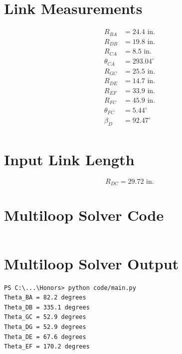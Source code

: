\documentclass[hidelinks]{article}
\begin{document}
    \FloatBarrier\section*{Link Measurements}
    \begin{align*}
        R_{BA}&=24.4 \text{ in.} \\
        R_{DB}&=19.8 \text{ in.} \\
        R_{CA}&=8.5 \text{ in.} \\
        \theta_{CA}&=293.04^\circ \\
        R_{GC}&=25.5 \text{ in.} \\
        R_{DE}&=14.7 \text{ in.} \\
        R_{EF}&=33.9 \text{ in.} \\
        R_{FC}&=45.9 \text{ in.} \\
        \theta_{FC}&=5.44^\circ \\
        \beta_{D}&=92.47^\circ \\
    \end{align*}

    \FloatBarrier\section*{Input Link Length}
    \begin{equation*}
        R_{DC}=29.72 \text{ in.}
    \end{equation*}
        
    \FloatBarrier\section*{Multiloop Solver Code}
    
    \inputminted[python3=true]{python}{../code/main.py}

    \section*{Multiloop Solver Output}
    \begin{verbatim}
PS C:\...\Honors> python code/main.py
Theta_BA = 82.2 degrees
Theta_DB = 335.1 degrees
Theta_GC = 52.9 degrees
Theta_DG = 52.9 degrees
Theta_DE = 67.6 degrees
Theta_EF = 170.2 degrees
    \end{verbatim}
\end{document}
